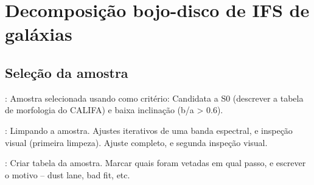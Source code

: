


\chapter{Decomposição bojo-disco de IFS de galáxias}
\label{sec:Decomp}


\section{Seleção da amostra}

\TODO: Amostra selecionada usando como critério: Candidata a S0 (descrever a
tabela de morfologia do CALIFA) e baixa inclinação (b/a > 0.6).

\TODO: Limpando a amostra. Ajustes iterativos de uma banda espectral, e inspeção
visual (primeira limpeza). Ajuste completo, e segunda inspeção visual.

\TODO: Criar tabela da amostra. Marcar quais foram vetadas em qual passo, e
escrever o motivo -- dust lane, bad fit, etc.



